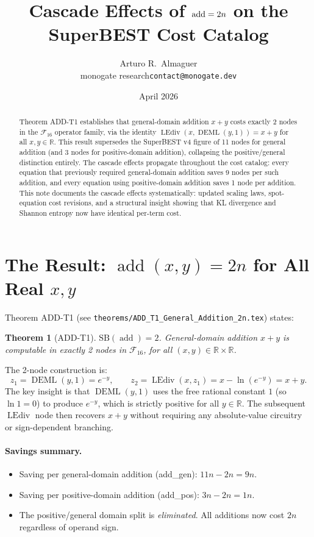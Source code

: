 \documentclass[12pt,a4paper]{article}
\title{Cascade Effects of $\addop = 2n$ on the SuperBEST Cost Catalog}
\author{Arturo R.\ Almaguer\\
  \small monogate research\quad\texttt{contact@monogate.dev}}
\date{April 2026}
\newtheorem{theorem}{Theorem}[section]
\theoremstyle{definition}
\newcommand{\DEML}{\operatorname{DEML}}
\newcommand{\LEdiv}{\operatorname{LEdiv}}
\newcommand{\addop}{\operatorname{add}}
\newcommand{\SB}{\mathrm{SB}}
\newcommand{\R}{\mathbb{R}}
\begin{document}
\maketitle

\begin{abstract}
Theorem ADD-T1 establishes that general-domain addition $x + y$ costs exactly
2 nodes in the $\mathcal{F}_{16}$ operator family, via the identity
$\LEdiv(x,\DEML(y,1)) = x + y$ for all $x, y \in \R$.
This result supersedes the SuperBEST v4 figure of 11 nodes for general addition
(and 3 nodes for positive-domain addition), collapsing the positive/general
distinction entirely.
The cascade effects propagate throughout the cost catalog: every equation that
previously required general-domain addition saves 9 nodes per such addition,
and every equation using positive-domain addition saves 1 node per addition.
This note documents the cascade effects systematically: updated scaling laws,
spot-equation cost revisions, and a structural insight showing that KL divergence
and Shannon entropy now have identical per-term cost.
\end{abstract}

\section{The Result: $\addop(x,y) = 2n$ for All Real $x, y$}
\label{sec:result}

Theorem ADD-T1 (see \texttt{theorems/ADD\_T1\_General\_Addition\_2n.tex}) states:

\begin{theorem}[ADD-T1]
$\SB(\addop) = 2$.  General-domain addition $x + y$ is computable in exactly
2 nodes in $\mathcal{F}_{16}$, for all $(x, y) \in \R \times \R$.
\end{theorem}

\noindent The 2-node construction is:
\[
  z_1 = \DEML(y,1) = e^{-y}, \qquad
  z_2 = \LEdiv(x, z_1) = x - \ln(e^{-y}) = x + y.
\]
The key insight is that $\DEML(y, 1)$ uses the free rational constant $1$
(so $\ln 1 = 0$) to produce $e^{-y}$, which is strictly positive for all $y \in \R$.
The subsequent $\LEdiv$ node then recovers $x + y$ without requiring any
absolute-value circuitry or sign-dependent branching.

\paragraph{Savings summary.}
\begin{itemize}
  \item Saving per general-domain addition (add\_gen): $11n - 2n = 9n$.
  \item Saving per positive-domain addition (add\_pos): $3n - 2n = 1n$.
  \item The positive/general domain split is \emph{eliminated}.
        All additions now cost $2n$ regardless of operand sign.
\end{itemize}
\end{document}
